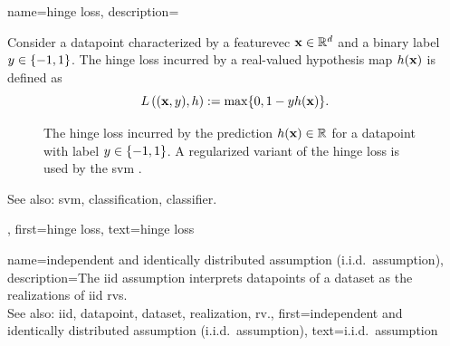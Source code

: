 {name={hinge loss}, 
	description={Consider a \gls{datapoint} 
		characterized by a \gls{featurevec} ${\bf x} \in \mathbb{R}^{d}$ and a 
		binary \gls{label} $y \in \{-1,1\}$. The hinge \gls{loss} incurred by a real-valued 
		\gls{hypothesis} \gls{map} $h({\bf x})$ is defined as 
		\begin{equation} 
			\label{equ_hinge_loss_gls_dict}
				L\left(({\bf x},y),h \right) := \max \{ 0 , 1 - y h({\bf x}) \}. 
		\end{equation}
		\begin{figure}[H]
		\begin{center}
		\caption{The hinge \gls{loss} incurred by the \gls{prediction} $h({\bf x}) \in \mathbb{R}$ 
		for a \gls{datapoint} with \gls{label} $y \in \{-1,1\}$. A regularized variant of the hinge 
		\gls{loss} is used by the \gls{svm} \cite{LampertNowKernel}.}
		\label{fig_hingeloss_dict}
		\end{center}
		\end{figure} 	    
		See also: \gls{svm}, \gls{classification}, \gls{classifier}.},
	first={hinge loss},
	text={hinge loss}
}

{name={independent and identically distributed assumption (i.i.d.\ assumption)}, 
	description={The \gls{iid} assumption interprets \glspl{datapoint} of a \gls{dataset} as the 
		\glspl{realization} of \gls{iid} \glspl{rv}.
				\\
		See also: \gls{iid}, \gls{datapoint}, \gls{dataset}, \gls{realization}, \gls{rv}.},
	first={independent and identically distributed assumption (i.i.d.\ assumption)},
	text={i.i.d.\ assumption} 
}

